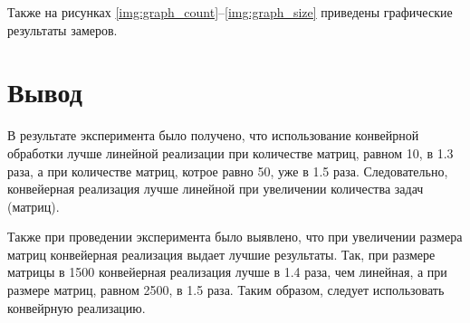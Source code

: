 \clearpage

Также на рисунках \ref{img:graph_count}--\ref{img:graph_size} приведены графические результаты замеров.


\clearpage


\section{Вывод}

В результате эксперимента было получено, что использование конвейрной обработки лучше линейной реализации при количестве матриц, равном 10, в 1.3 раза, а при количестве матриц, котрое равно 50, уже в 1.5 раза. Следовательно, конвейерная реализация лучше линейной при увеличении количества задач (матриц).

Также при проведении эксперимента было выявлено, что при увеличении размера матриц конвейерная реализация выдает лучшие результаты. Так, при размере матрицы в 1500 конвейерная реализация лучше в 1.4 раза, чем линейная, а при размере матриц, равном 2500, в 1.5 раза. Таким образом, следует использовать конвейрную реализацию.